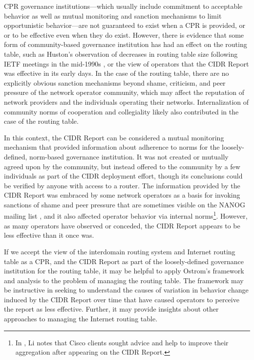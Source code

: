 CPR governance institutions---which usually include commitment to acceptable behavior as well as mutual monitoring and sanction mechanisms to limit opportunistic behavior---are not guaranteed to exist when a CPR is provided, or or to be effective even when they do exist. However, there is evidence that some form of community-based governance institution has had an effect on the routing table, such as Huston's observation of decreases in routing table size following IETF meetings in the mid-1990s \cite{Huston:2001bs,Clayton:2010bh}, or the view of operators that the CIDR Report was effective in its early days. In the case of the routing table, there are no explicitly obvious sanction mechanisms beyond shame, criticism, and peer pressure of the network operator community, which may affect the reputation of network providers and the individuals operating their networks. Internalization of community norms of cooperation and collegiality \cite{Abbate:2000ve} likely also contributed in the case of the routing table.

In this context, the CIDR Report can be considered a mutual monitoring mechanism that provided information about adherence to norms for the loosely-defined, norm-based governance institution. It was not created or mutually agreed upon by the community, but instead offered to the community by a few individuals as part of the CIDR deployment effort, though its conclusions could be verified by anyone with access to a router. The information provided by the CIDR Report was embraced by some network operators as a basis for invoking sanctions of shame and peer pressure that are sometimes visible on the NANOG mailing list \cite{NANOG}, and it also affected operator behavior via internal norms\footnote{In \cite{Li:2011vn}, Li notes that Cisco clients sought advice and help to improve their aggregation after appearing on the CIDR Report.}. However, as many operators have observed or conceded, the CIDR Report appears to be less effective than it once was.

If we accept the view of the interdomain routing system and Internet routing table as a CPR, and the CIDR Report as part of the loosely-defined governance institution for the routing table, it may be helpful to apply Ostrom's framework and analysis to the problem of managing the routing table. The framework may be instructive in seeking to understand the causes of variation in behavior change induced by the CIDR Report over time that have caused operators to perceive the report as less effective. Further, it may provide insights about other approaches to managing the Internet routing table.

